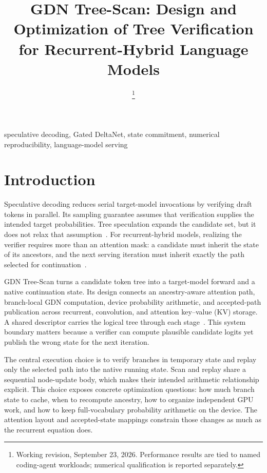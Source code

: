 \documentclass[conference]{IEEEtran}
\newcommand{\sys}{GDN Tree-Scan}
\begin{document}
\title{GDN Tree-Scan: Design and Optimization of Tree Verification for Recurrent-Hybrid Language Models}
\author{
\thanks{Working revision, September 23, 2026. Performance results are tied to named coding-agent workloads; numerical qualification is reported separately.}}
\maketitle

\begin{IEEEkeywords}
speculative decoding, Gated DeltaNet, state commitment, numerical reproducibility, language-model serving
\end{IEEEkeywords}

\section{Introduction}
Speculative decoding reduces serial target-model invocations by verifying draft tokens in parallel. Its sampling guarantee assumes that verification supplies the intended target probabilities. Tree speculation expands the candidate set, but it does not relax that assumption~\cite{leviathan2023fast,chen2023sampling,miao2023specinfer}. For recurrent-hybrid models, realizing the verifier requires more than an attention mask: a candidate must inherit the state of its ancestors, and the next serving iteration must inherit exactly the path selected for continuation~\cite{yang2024gated,wu2025stree}.

\sys{} turns a candidate token tree into a target-model forward and a native continuation state. Its design connects an ancestry-aware attention path, branch-local GDN computation, device probability arithmetic, and accepted-path publication across recurrent, convolution, and attention key--value (KV) storage. A shared descriptor carries the logical tree through each stage~\cite{lumo2026archive,lumo2026stateless}. This system boundary matters because a verifier can compute plausible candidate logits yet publish the wrong state for the next iteration.

The central execution choice is to verify branches in temporary state and replay only the selected path into the native running state. Scan and replay share a sequential node-update body, which makes their intended arithmetic relationship explicit. This choice exposes concrete optimization questions: how much branch state to cache, when to recompute ancestry, how to organize independent GPU work, and how to keep full-vocabulary probability arithmetic on the device. The attention layout and accepted-state mappings constrain those changes as much as the recurrent equation does.
\end{document}
